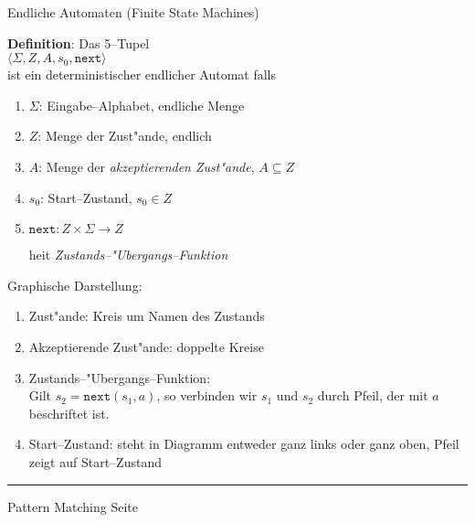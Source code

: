 
\begin{slide}{}
\normalsize

\begin{center}
Endliche Automaten (Finite State Machines)
\end{center}
\vspace*{0.5cm}

\footnotesize
\textbf{Definition}: Das 5--Tupel \\[0.3cm]
\hspace*{1.3cm} $\langle \Sigma, Z, A, s_0, \mathtt{next}  \rangle$ \\[0.3cm]
ist ein deterministischer endlicher Automat falls
\begin{enumerate}
\item $\Sigma$: Eingabe--Alphabet, endliche Menge
\item $Z$: Menge der Zust"ande, endlich
\item $A$: Menge der \emph{akzeptierenden Zust"ande}, $A \subseteq Z$
\item $s_0$: Start--Zustand, $s_0 \in Z$
\item $\mathtt{next}: Z \times \Sigma \rightarrow Z$

      hei\3t \emph{Zustands--"Ubergangs--Funktion}
\end{enumerate}

Graphische Darstellung:
\begin{enumerate}
\item Zust"ande: Kreis um Namen des Zustands
\item Akzeptierende Zust"ande: doppelte Kreise
\item Zustands--"Ubergangs--Funktion: \\
       Gilt $s_2 = \mathtt{next}(s_1, a)$,
      so verbinden wir $s_1$ und $s_2$ durch Pfeil, der mit $a$ beschriftet ist.
\item Start--Zustand: steht in Diagramm entweder ganz links oder ganz oben, Pfeil zeigt auf Start--Zustand
\end{enumerate}


\vspace*{\fill}
\tiny \addtocounter{mypage}{1}
\rule{17cm}{1mm}
Pattern Matching \hspace*{\fill} Seite 
\end{slide}


